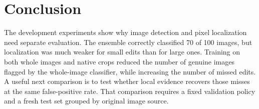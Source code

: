 




\section{Conclusion}
The development experiments show why image detection and pixel localization need separate evaluation. The ensemble correctly classified 70 of 100 images, but localization was much weaker for small edits than for large ones. Training on both whole images and native crops reduced the number of genuine images flagged by the whole-image classifier, while increasing the number of missed edits. A useful next comparison is to test whether local evidence recovers those misses at the same false-positive rate. That comparison requires a fixed validation policy and a fresh test set grouped by original image source.
